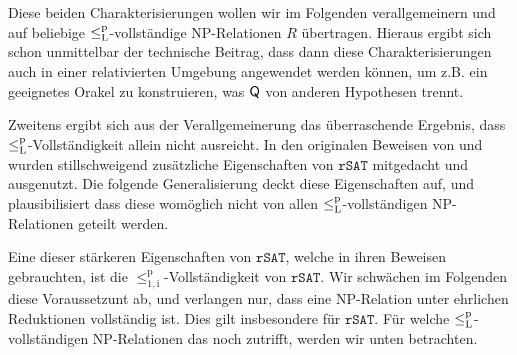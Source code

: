 Diese beiden Charakterisierungen wollen wir im Folgenden verallgemeinern und auf beliebige $\leq_\mathrm{L}^\mathrm{p}$-vollständige NP-Relationen $R$ übertragen. 
Hieraus ergibt sich schon unmittelbar der technische Beitrag, dass dann diese Charakterisierungen auch in einer relativierten Umgebung angewendet werden können, um z.B. ein geeignetes Orakel zu konstruieren, was $\mathsf{Q}$ von anderen Hypothesen trennt.

Zweitens ergibt sich aus der Verallgemeinerung das überraschende Ergebnis, dass $\leq_\mathrm{L}^\mathrm{p}$-Vollständigkeit allein nicht ausreicht. In den originalen Beweisen von \citeauthor{fenner_inverting_2003} und \citeauthor{messner_simulation_2001} wurden stillschweigend zusätzliche Eigenschaften von $\mathtt{rSAT}$ mitgedacht und ausgenutzt. Die folgende Generalisierung deckt diese Eigenschaften auf, und plausibilisiert dass diese womöglich nicht von allen $\leq_\mathrm{L}^\mathrm{p}$-vollständigen NP-Relationen geteilt werden.

Eine dieser stärkeren Eigenschaften von $\mathtt{rSAT}$, welche \citeauthor{fenner_inverting_2003} in ihren Beweisen gebrauchten, ist die $\leq_\mathrm{1,i}^\mathrm p$-Vollständigkeit von $\mathtt{rSAT}$. Wir schwächen im Folgenden diese Voraussetzunt ab, und verlangen nur, dass eine NP-Relation unter ehrlichen Reduktionen vollständig ist. Dies gilt insbesondere für $\mathtt{rSAT}$.
Für welche $\leq_\mathrm{L}^\mathrm{p}$-vollständigen NP-Relationen das noch zutrifft, werden wir unten betrachten.


